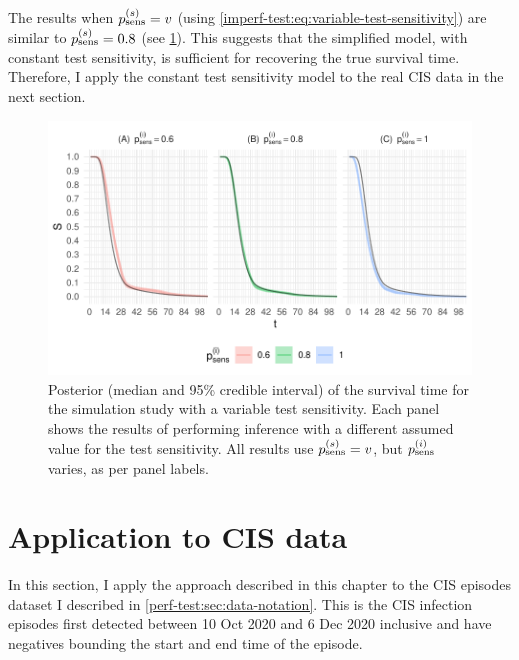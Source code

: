\documentclass[thesis.tex]{subfiles}
\begin{document}
The results when $p_\text{sens}^{(s)} = v$ (\ie using \cref{imperf-test:eq:variable-test-sensitivity}) are similar to $p_\text{sens}^{(s)} = 0.8$ (see \cref{imperf-test:fig:variable-test-sensitivity}).
This suggests that the simplified model, with constant test sensitivity, is sufficient for recovering the true survival time.
Therefore, I apply the constant test sensitivity model to the real CIS data in the next section.
\begin{figure}
    \includegraphics[width=\textwidth]{cis-imperfect-testing/sim-variable-sensitivity}
  \caption[Simulation study results with varying test sensitivity]{%
    Posterior (median and 95\% credible interval) of the survival time for the simulation study with a variable test sensitivity.
    Each panel shows the results of performing inference with a different assumed value for the test sensitivity.
    All results use $p_\text{sens}^{(s)} = v$, but $p_\text{sens}^{(i)}$ varies, as per panel labels.
  }
  \label{imperf-test:fig:variable-test-sensitivity}
\end{figure}

\section{Application to CIS data} \label{imperf-test:sec:application}

In this section, I apply the approach described in this chapter to the CIS episodes dataset I described in \cref{perf-test:sec:data-notation}.
This is the  CIS infection episodes first detected between 10 Oct 2020 and 6 Dec 2020 inclusive and have negatives bounding the start and end time of the episode.
\end{document}
